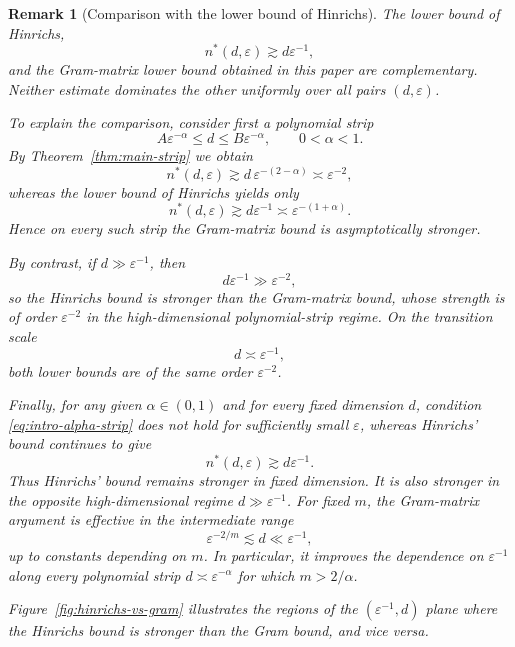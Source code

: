\documentclass[10pt,a4paper]{amsart}
\newtheorem{remark}[theorem]{Remark}
\newcommand{\1}{\mathbf{1}}
\begin{document}
\begin{remark}[Comparison with the lower bound of Hinrichs]\label{rem:comparison-hinrichs-gram}
The lower bound of Hinrichs,
\[
 n^{\ast}(d,\varepsilon)\gtrsim d\varepsilon^{-1},
\]
and the Gram-matrix lower bound obtained in this paper are complementary.  Neither estimate dominates the other uniformly over all pairs \((d,\varepsilon)\).

To explain the comparison, consider first a polynomial strip
\[
 A\varepsilon^{-\alpha}\le d\le B\varepsilon^{-\alpha},
 \qquad 0<\alpha<1.
\]
By Theorem~\ref{thm:main-strip} we obtain
\[
 n^{\ast}(d,\varepsilon)\gtrsim d\,\varepsilon^{-(2-\alpha)}
 \asymp \varepsilon^{-2},
\]
whereas the lower bound of Hinrichs yields only
\[
 n^{\ast}(d,\varepsilon)\gtrsim d\varepsilon^{-1}
 \asymp \varepsilon^{-(1+\alpha)}.
\]
Hence on every such strip the Gram-matrix bound is asymptotically stronger.

By contrast, if \(d\gg \varepsilon^{-1}\), then
\[
 d\varepsilon^{-1}\gg \varepsilon^{-2},
\]
so the Hinrichs bound is stronger than the Gram-matrix bound, whose strength is of order \(\varepsilon^{-2}\) in the high-dimensional polynomial-strip regime.  On the transition scale
\[
 d\asymp \varepsilon^{-1},
\]
both lower bounds are of the same order \(\varepsilon^{-2}\).

Finally, for any given $\alpha \in (0, 1)$ and for every fixed dimension $d$, condition \eqref{eq:intro-alpha-strip} does not hold for sufficiently small \(\varepsilon\), whereas Hinrichs' bound continues to give
\[
 n^{\ast}(d,\varepsilon)\gtrsim d\varepsilon^{-1}.
\]
Thus Hinrichs' bound remains stronger in fixed dimension.  It is also
stronger in the opposite high-dimensional regime \(d\gg\varepsilon^{-1}\).
For fixed \(m\), the Gram-matrix argument is effective in the intermediate
range
\[
 \varepsilon^{-2/m}\lesssim d\ll\varepsilon^{-1},
\]
up to constants depending on \(m\).  In particular, it improves the
dependence on \(\varepsilon^{-1}\) along every polynomial strip
\(d\asymp\varepsilon^{-\alpha}\) for which \(m>2/\alpha\).


Figure~\ref{fig:hinrichs-vs-gram} illustrates the regions of the $(\varepsilon^{-1}, d)$ plane where the Hinrichs bound is stronger than the Gram bound, and vice versa.
\end{remark}
\end{document}
